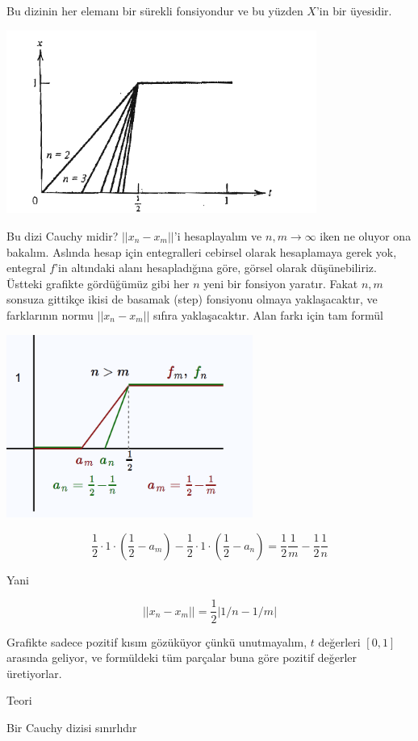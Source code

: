 \documentclass[12pt,fleqn]{article}\usepackage{../../common}
\begin{document}
Bu dizinin her elemanı bir sürekli fonsiyondur ve bu yüzden $X$'in bir
üyesidir. 

\includegraphics[height=6cm]{5_1.png}

Bu dizi Cauchy midir? $||x_n - x_m||$'i hesaplayalım ve $n,m \to \infty$
iken ne oluyor ona bakalım. Aslında hesap için entegralleri cebirsel olarak
hesaplamaya gerek yok, entegral $f$'in altındaki alanı hesapladığına göre,
görsel olarak düşünebiliriz. Üstteki grafikte gördüğümüz gibi her $n$ yeni
bir fonsiyon yaratır. Fakat $n,m$ sonsuza gittikçe ikisi de basamak (step)
fonsiyonu olmaya yaklaşacaktır, ve farklarının normu $||x_n - x_m||$ sıfıra
yaklaşacaktır. Alan farkı için tam formül

\includegraphics[height=6cm]{5_2.png}

$$ 
\frac{1}{2} \cdot 1 \cdot (\frac{ 1}{2}-a_m) - 
\frac{1}{2} \cdot 1 \cdot (\frac{ 1}{2}-a_n) =
\frac{ 1}{2}\frac{ 1}{m} - 
\frac{ 1}{2}\frac{ 1}{n} 
 $$

Yani

$$ ||x_n - x_m|| = \frac{ 1}{2}|1/n - 1/m| $$

Grafikte sadece pozitif kısım gözüküyor çünkü unutmayalım, $t$ değerleri
$[0,1]$ arasında geliyor, ve formüldeki tüm parçalar buna göre pozitif
değerler üretiyorlar. 

Teori 

Bir Cauchy dizisi sınırlıdır
\end{document}
